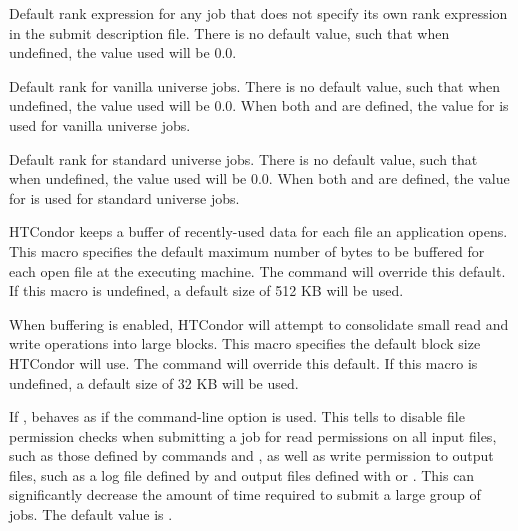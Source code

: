 \begin{description}

\label{param:DefaultRank}
\item[\Macro{DEFAULT\_RANK}]
  Default rank expression for any job that does not specify
  its own rank expression in the submit description file.  
  There is no default value, such that when undefined,
  the value used will be 0.0.

\label{param:DefaultRankVanilla}
\item[\Macro{DEFAULT\_RANK\_VANILLA}]
  Default rank for vanilla universe jobs.  
  There is no default value, such that when undefined,
  the value used will be 0.0.
  When both  and 
  are defined, the value for  is
  used for vanilla universe jobs.

\label{param:DefaultRankStandard}
\item[\Macro{DEFAULT\_RANK\_STANDARD}]
  Default rank for standard universe jobs.
  There is no default value, such that when undefined,
  the value used will be 0.0.
  When both  and 
  are defined, the value for  is
  used for standard universe jobs.

\label{param:DefaultBufferSize}
\item[\Macro{DEFAULT\_IO\_BUFFER\_SIZE}]
  HTCondor keeps a buffer of recently-used data for each file an
  application opens.  This macro specifies the default maximum number
  of bytes to be buffered for each open file at the executing machine.
  The   command will override this
  default.  If this macro is undefined, a default size of 512 KB will
  be used.

\label{param:DefaultBufferBlockSize}
\item[\Macro{DEFAULT\_IO\_BUFFER\_BLOCK\_SIZE}] 
  When buffering is enabled,
  HTCondor will attempt to consolidate small read and write operations
  into large blocks.  This macro specifies the default block size
  HTCondor will use.  The  
  command will override this default.  If this macro is undefined, a
  default size of 32 KB will be used.

\label{param:SubmitSkipFilechecks}
\item[\Macro{SUBMIT\_SKIP\_FILECHECKS}]
  If ,  behaves as if the  
  command-line option is used.
  This tells  to disable file permission checks 
  when submitting a job
  for read permissions on all input files, such as those defined by
  commands  and ,
  as well as write permission to output files, such as a
  log file defined by  and output files defined with 
   or .
  This can significantly decrease the amount of time required to submit
  a large group of jobs.
  The default value is .


\end{description}
